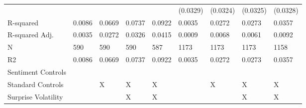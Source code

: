 \begin{tabular}{lllllllll}
 &  &  &  &  & (0.0329) & (0.0324) & (0.0325) & (0.0328) \\
R-squared & 0.0086 & 0.0669 & 0.0737 & 0.0922 & 0.0035 & 0.0272 & 0.0273 & 0.0357 \\
R-squared Adj. & 0.0035 & 0.0272 & 0.0326 & 0.0415 & 0.0009 & 0.0068 & 0.0061 & 0.0092 \\
N & 590 & 590 & 590 & 587 & 1173 & 1173 & 1173 & 1158 \\
R2 & 0.0086 & 0.0669 & 0.0737 & 0.0922 & 0.0035 & 0.0272 & 0.0273 & 0.0357 \\
Sentiment Controls &  &  &  &  &  &  &  &  \\
Standard Controls &  & X & X & X &  & X & X & X \\
Surprise Volatility &  &  & X & X &  &  & X & X \\
\bottomrule
\end{tabular}
